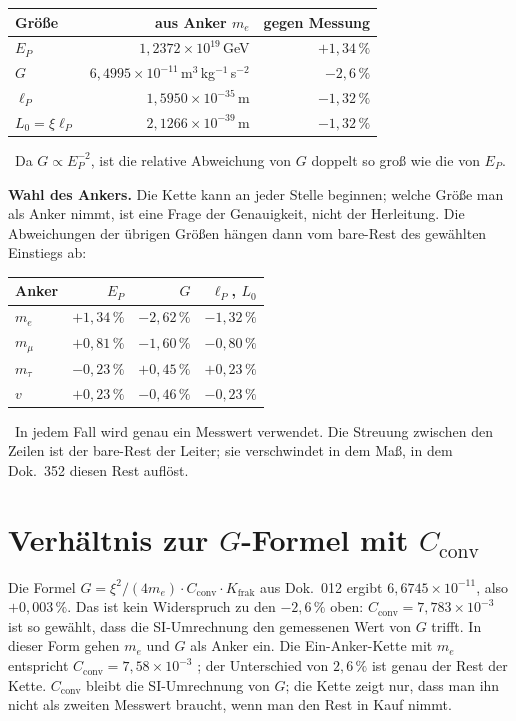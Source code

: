 \begin{center}
\begin{tabular}{@{}lrr@{}}
\toprule
\textbf{Größe} & \textbf{aus Anker $m_e$} & \textbf{gegen Messung}\\
\midrule
$E_P$    & $1{,}2372\times10^{19}$\,GeV & $+1{,}34\,\%$\\
$G$      & $6{,}4995\times10^{-11}$\,m$^3$\,kg$^{-1}$\,s$^{-2}$ & $-2{,}6\,\%$\\
$\ell_P$ & $1{,}5950\times10^{-35}$\,m & $-1{,}32\,\%$\\
$L_0=\xi\ell_P$ & $2{,}1266\times10^{-39}$\,m & $-1{,}32\,\%$\\
\bottomrule
\end{tabular}
\end{center}
\KM\ Da $G\propto E_P^{-2}$, ist die relative Abweichung von $G$ doppelt so groß wie
die von $E_P$.

\textbf{Wahl des Ankers.} Die Kette kann an jeder Stelle beginnen; welche Größe man
als Anker nimmt, ist eine Frage der Genauigkeit, nicht der Herleitung. Die
Abweichungen der übrigen Größen hängen dann vom bare-Rest des gewählten Einstiegs ab:

\begin{center}
\begin{tabular}{@{}lrrr@{}}
\toprule
\textbf{Anker} & $E_P$ & $G$ & $\ell_P$, $L_0$\\
\midrule
$m_e$    & $+1{,}34\,\%$ & $-2{,}62\,\%$ & $-1{,}32\,\%$\\
$m_\mu$  & $+0{,}81\,\%$ & $-1{,}60\,\%$ & $-0{,}80\,\%$\\
$m_\tau$ & $-0{,}23\,\%$ & $+0{,}45\,\%$ & $+0{,}23\,\%$\\
$v$      & $+0{,}23\,\%$ & $-0{,}46\,\%$ & $-0{,}23\,\%$\\
\bottomrule
\end{tabular}
\end{center}
\KM\ In jedem Fall wird genau ein Messwert verwendet. Die Streuung zwischen den Zeilen
ist der bare-Rest der Leiter; sie verschwindet in dem Maß, in dem Dok.~352 diesen Rest
auflöst.

\section{Verhältnis zur \texorpdfstring{$G$}{G}-Formel mit \texorpdfstring{$C_{\text{conv}}$}{C\_conv}}
Die Formel $G=\xi^2/(4m_e)\cdot C_{\text{conv}}\cdot K_{\text{frak}}$ aus Dok.~012
ergibt $6{,}6745\times10^{-11}$, also $+0{,}003\,\%$. Das ist kein Widerspruch zu den
$-2{,}6\,\%$ oben: $C_{\text{conv}}=7{,}783\times10^{-3}$ ist so gewählt, dass die
SI-Umrechnung den gemessenen Wert von $G$ trifft. In dieser Form gehen $m_e$ und $G$
als Anker ein. Die Ein-Anker-Kette mit $m_e$ entspricht
$C_{\text{conv}}=7{,}58\times10^{-3}$ \KM; der Unterschied von $2{,}6\,\%$ ist genau
der Rest der Kette. $C_{\text{conv}}$ bleibt die SI-Umrechnung von $G$; die Kette zeigt
nur, dass man ihn nicht als zweiten Messwert braucht, wenn man den Rest in Kauf nimmt.

